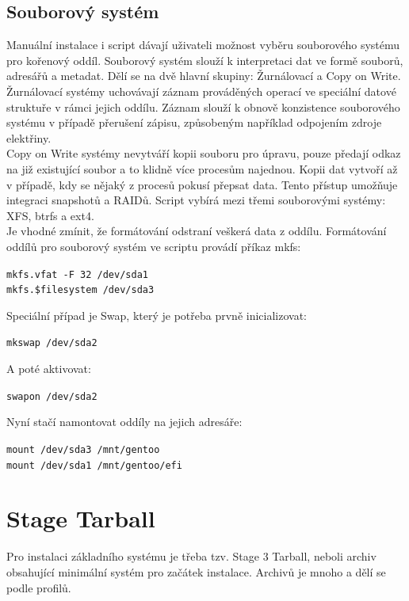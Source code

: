 \documentclass[12pt,a4paper,twoside,]{article}
\begin{document}
{\subsection{\textsf{Souborový systém}}\hypertarget{Souborový systém}{}
Manuální instalace i script dávají uživateli možnost vyběru souborového systému pro kořenový oddíl.
Souborový systém slouží k interpretaci dat ve formě souborů, adresářů a metadat. Dělí se na dvě hlavní skupiny: Žurnálovací a Copy on Write.\\
Žurnálovací systémy uchovávají záznam prováděných operací ve speciální datové struktuře v rámci jejich oddílu. 
Záznam slouží k obnově konzistence souborového systému v případě přerušení zápisu, způsobeným například odpojením zdroje elektřiny. \\
Copy on Write systémy nevytváří kopii souboru pro úpravu, pouze předají odkaz na již existující soubor a to klidně více procesům najednou.
Kopii dat vytvoří až v případě, kdy se nějaký z procesů pokusí přepsat data. Tento přístup umožňuje integraci snapshotů a RAIDů.
Script vybírá mezi třemi souborovými systémy: XFS, btrfs a ext4. \\Je vhodné zmínit, že formátování odstraní veškerá data z oddílu. 
Formátování oddílů pro souborový systém ve scriptu provádí příkaz mkfs: 

\texttt{mkfs.vfat -F 32 /dev/sda1}\\
\texttt{\hspace*{1.5em}mkfs.\$filesystem /dev/sda3}

\hspace*{-1.5em}Speciální případ je Swap, který je potřeba prvně inicializovat: 

\texttt{mkswap /dev/sda2}

\hspace*{-1.5em}A poté aktivovat:

\texttt{swapon /dev/sda2}

\hspace*{-1.5em}Nyní stačí namontovat oddíly na jejich adresáře:

\texttt{mount /dev/sda3 /mnt/gentoo}\\
\texttt{\hspace*{1.5em}mount /dev/sda1 /mnt/gentoo/efi}

\newpage
\section{\textsf{Stage Tarball}}
{Pro instalaci základního systému je třeba tzv. Stage 3 Tarball, neboli archiv obsahující
minimální systém pro začátek instalace. Archivů je mnoho a dělí se podle profilů.

}}
\end{document}
